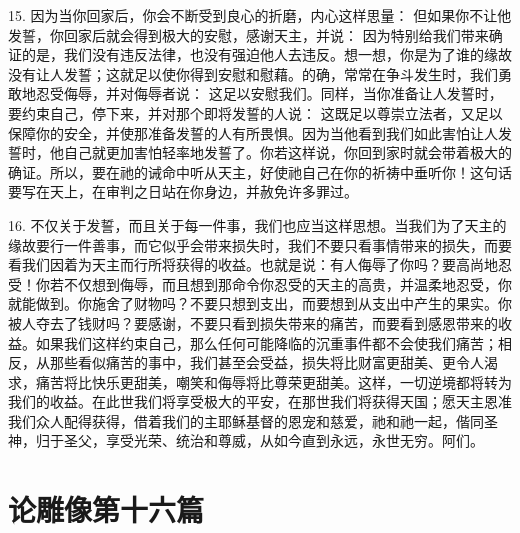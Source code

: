 15. 因为当你回家后，你会不断受到良心的折磨，内心这样思量： 但如果你不让他发誓，你回家后就会得到极大的安慰，感谢天主，并说： 因为特别给我们带来确证的是，我们没有违反法律，也没有强迫他人去违反。想一想，你是为了谁的缘故没有让人发誓；这就足以使你得到安慰和慰藉。的确，常常在争斗发生时，我们勇敢地忍受侮辱，并对侮辱者说： 这足以安慰我们。同样，当你准备让人发誓时，要约束自己，停下来，并对那个即将发誓的人说： 这既足以尊崇立法者，又足以保障你的安全，并使那准备发誓的人有所畏惧。因为当他看到我们如此害怕让人发誓时，他自己就更加害怕轻率地发誓了。你若这样说，你回到家时就会带着极大的确证。所以，要在祂的诫命中听从天主，好使祂自己在你的祈祷中垂听你！这句话要写在天上，在审判之日站在你身边，并赦免许多罪过。\par

16. 不仅关于发誓，而且关于每一件事，我们也应当这样思想。当我们为了天主的缘故要行一件善事，而它似乎会带来损失时，我们不要只看事情带来的损失，而要看我们因着为天主而行所将获得的收益。也就是说：有人侮辱了你吗？要高尚地忍受！你若不仅想到侮辱，而且想到那命令你忍受的天主的高贵，并温柔地忍受，你就能做到。你施舍了财物吗？不要只想到支出，而要想到从支出中产生的果实。你被人夺去了钱财吗？要感谢，不要只看到损失带来的痛苦，而要看到感恩带来的收益。如果我们这样约束自己，那么任何可能降临的沉重事件都不会使我们痛苦；相反，从那些看似痛苦的事中，我们甚至会受益，损失将比财富更甜美、更令人渴求，痛苦将比快乐更甜美，嘲笑和侮辱将比尊荣更甜美。这样，一切逆境都将转为我们的收益。在此世我们将享受极大的平安，在那世我们将获得天国；愿天主恩准我们众人配得获得，借着我们的主耶稣基督的恩宠和慈爱，祂和祂一起，偕同圣神，归于圣父，享受光荣、统治和尊威，从如今直到永远，永世无穷。阿们。\par



\section{论雕像第十六篇}

